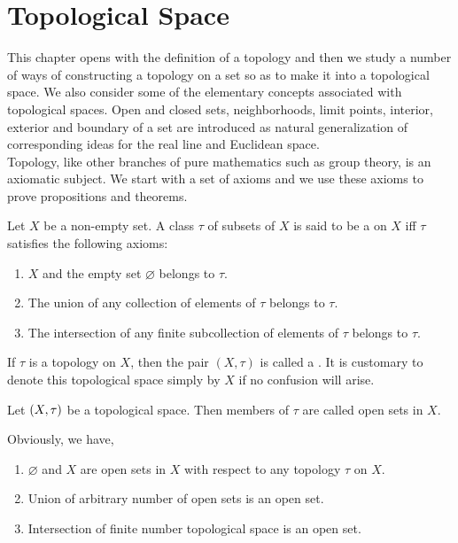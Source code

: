 \documentclass[../main-sheet.tex]{subfiles}
\begin{document}
\chapter{Topological Space}
This chapter opens with the definition of a topology and then we study a number of ways of constructing a topology on a set so as to make it into a topological space.
We also consider some of the elementary concepts associated with topological spaces.
Open and closed sets, neighborhoods, limit points, interior, exterior and boundary of a set are introduced as natural generalization of corresponding ideas for the real line and Euclidean space.\\
Topology, like other branches of pure mathematics such as group theory, is an axiomatic subject.
We start with a set of axioms and we use these axioms to prove propositions and theorems.
\begin{defn}
    Let  \(X\) be a non-empty set. A class  \(\tau \) of subsets of  \(X\) is said to be a  on  \(X\) iff  \(\tau\) satisfies the following axioms:
    \begin{enumerate}[label=(\roman*)]
        \item  \(X\) and the empty set  \(\varnothing\) belongs to  \(\tau\).
        \item The union of any collection of elements of  \(\tau\) belongs to  \(\tau\).
        \item The intersection of any finite subcollection of elements of  \(\tau\) belongs to  \(\tau\).
    \end{enumerate}
    If  \(\tau\) is a topology on  \(X\), then the pair  \((X, \tau)\) is called a . It is customary to denote this topological space simply by  \(X\) if no confusion will arise.
\end{defn}
\begin{defn}
    Let  \((X, \tau)\) be a topological space. Then
    members of  \(\tau\) are called open sets in  \(X\).
\end{defn}
    Obviously, we have,
    \begin{enumerate}[label=(\roman*)]
        \item  \(\varnothing\) and  \(X\) are open sets in  \(X\) with respect to any topology  \(\tau\) on  \(X\).
        \item Union of arbitrary number of open sets is an open set.
        \item Intersection of finite number topological space is an open set. \label{enum:defn3}
    \end{enumerate}
\end{document}
